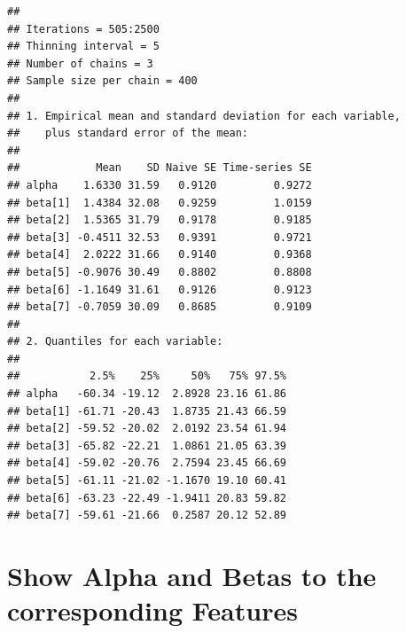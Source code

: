 \documentclass[
]{article}
\newenvironment{Shaded}{\begin{snugshade}}{\end{snugshade}}
\newcommand{\DecValTok}[1]{\textcolor[rgb]{0.00,0.00,0.81}{#1}}
\newcommand{\FunctionTok}[1]{\textcolor[rgb]{0.13,0.29,0.53}{\textbf{#1}}}
\newcommand{\NormalTok}[1]{#1}
\newcommand{\OtherTok}[1]{\textcolor[rgb]{0.56,0.35,0.01}{#1}}
\newcommand{\SpecialCharTok}[1]{\textcolor[rgb]{0.81,0.36,0.00}{\textbf{#1}}}
\begin{document}
\begin{verbatim}
## 
## Iterations = 505:2500
## Thinning interval = 5 
## Number of chains = 3 
## Sample size per chain = 400 
## 
## 1. Empirical mean and standard deviation for each variable,
##    plus standard error of the mean:
## 
##            Mean    SD Naive SE Time-series SE
## alpha    1.6330 31.59   0.9120         0.9272
## beta[1]  1.4384 32.08   0.9259         1.0159
## beta[2]  1.5365 31.79   0.9178         0.9185
## beta[3] -0.4511 32.53   0.9391         0.9721
## beta[4]  2.0222 31.66   0.9140         0.9368
## beta[5] -0.9076 30.49   0.8802         0.8808
## beta[6] -1.1649 31.61   0.9126         0.9123
## beta[7] -0.7059 30.09   0.8685         0.9109
## 
## 2. Quantiles for each variable:
## 
##           2.5%    25%     50%   75% 97.5%
## alpha   -60.34 -19.12  2.8928 23.16 61.86
## beta[1] -61.71 -20.43  1.8735 21.43 66.59
## beta[2] -59.52 -20.02  2.0192 23.54 61.94
## beta[3] -65.82 -22.21  1.0861 21.05 63.39
## beta[4] -59.02 -20.76  2.7594 23.45 66.69
## beta[5] -61.11 -21.02 -1.1670 19.10 60.41
## beta[6] -63.23 -22.49 -1.9411 20.83 59.82
## beta[7] -59.61 -21.66  0.2587 20.12 52.89
\end{verbatim}

\section{Show Alpha and Betas to the corresponding
Features}\label{show-alpha-and-betas-to-the-corresponding-features-2}

\begin{Shaded}
\end{Shaded}
\end{document}
